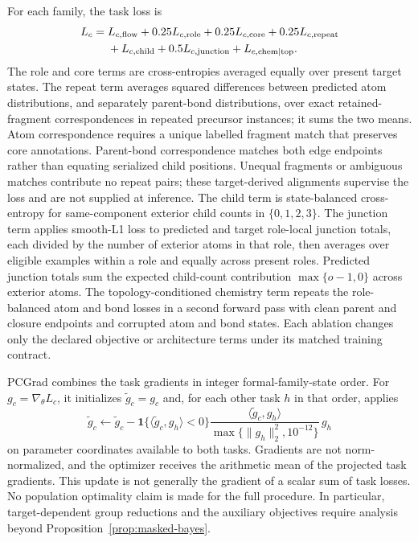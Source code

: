 For each family, the task loss is
\begin{equation}
\begin{aligned}
 L_c={}&L_{c,\rm flow}
 +0.25L_{c,\rm role}+0.25L_{c,\rm core}+0.25L_{c,\rm repeat}\\
 &+L_{c,\rm child}+0.5L_{c,\rm junction}+L_{c,\rm chem\mid top}.
\end{aligned}
\label{eq:production-task-loss}
\end{equation}
The role and core terms are cross-entropies averaged equally over present target states.
The repeat term averages squared differences between predicted atom distributions, and separately
parent-bond distributions, over exact retained-fragment correspondences in repeated precursor
instances; it sums the two means. Atom correspondence requires a unique labelled fragment match
that preserves core annotations. Parent-bond correspondence matches both edge endpoints rather
than equating serialized child positions. Unequal fragments or ambiguous matches contribute no
repeat pairs; these target-derived alignments supervise the loss and are not supplied at inference.
The child term is state-balanced cross-entropy for same-component exterior child
counts in $\{0,1,2,3\}$. The junction term applies smooth-L1 loss to predicted and target
role-local junction totals, each divided by the number of exterior atoms in that role, then averages
over eligible examples within a role and equally across present roles. Predicted junction totals
sum the expected child-count contribution $\max\{o-1,0\}$ across exterior atoms.
The topology-conditioned chemistry term repeats the role-balanced atom and bond losses in a second
forward pass with clean parent and closure endpoints and corrupted atom and bond states.
Each ablation changes only the declared objective or architecture terms under its matched training contract.

PCGrad combines the task gradients in integer formal-family-state order. For
$g_c=\nabla_\theta L_c$, it initializes $\widetilde g_c=g_c$ and, for each other task $h$ in that
order, applies
\begin{equation}
 \widetilde g_c\leftarrow\widetilde g_c-
 \mathbf1\{\langle\widetilde g_c,g_h\rangle<0\}
 \frac{\langle\widetilde g_c,g_h\rangle}{\max\{\|g_h\|_2^2,10^{-12}\}}\,g_h
\end{equation}
on parameter coordinates available to both tasks. Gradients are not norm-normalized, and the
optimizer receives the arithmetic mean of the projected task gradients. This update is not generally
the gradient of a scalar sum of task losses. No population optimality claim is made for the full
procedure. In particular, target-dependent group reductions and the auxiliary objectives require
analysis beyond Proposition~\ref{prop:masked-bayes}.

